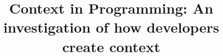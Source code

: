 \documentclass[sigconf]{acmart}
\begin{document}
\title{Context in Programming: An investigation of how developers create context}









\renewcommand{\shortauthors}{S. Chattopadhyay et al.}
\end{document}
